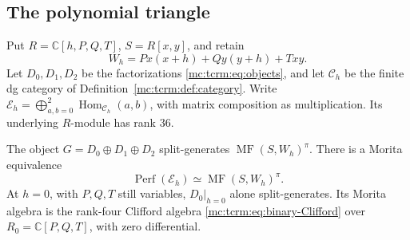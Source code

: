 \subsection{The polynomial triangle}

Put $R=\mathbb C[h,P,Q,T]$, $S=R[x,y]$, and retain
\[
 W_h=Px(x+h)+Qy(y+h)+Txy.
\]
Let $D_0,D_1,D_2$ be the factorizations
\eqref{mc:tcrm:eq:objects}, and let $\mathcal C_h$ be the
finite dg category of Definition~\ref{mc:tcrm:def:category}.
Write $\mathcal E_h=\bigoplus_{a,b=0}^2
\operatorname{Hom}_{\mathcal C_h}(a,b)$, with matrix
composition as multiplication. Its underlying $R$-module
has rank $36$.

\begin{theorem}\label{mc:cgcr:thm:triangle}
The object $G=D_0\oplus D_1\oplus D_2$ split-generates
$\operatorname{MF}(S,W_h)^\pi$. There is a Morita equivalence
\begin{equation}\label{mc:cgcr:eq:Morita}
 \operatorname{Perf}(\mathcal E_h)
       \simeq\operatorname{MF}(S,W_h)^\pi.
\end{equation}
At $h=0$, with $P,Q,T$ still variables, $D_0|_{h=0}$
alone split-generates. Its Morita algebra is the rank-four
Clifford algebra \eqref{mc:tcrm:eq:binary-Clifford} over
$R_0=\mathbb C[P,Q,T]$, with zero differential.
\end{theorem}

